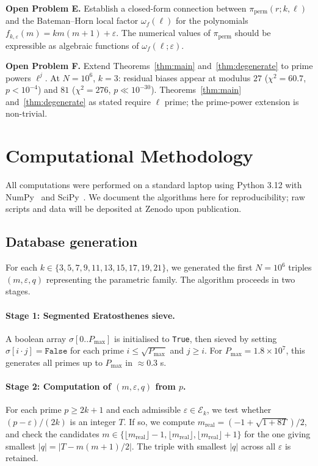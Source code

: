 \documentclass[11pt,a4paper]{article}
\theoremstyle{plain}
\theoremstyle{definition}
\newcommand{\PiP}{\pi_{\mathrm{perm}}}
\newcommand{\eps}{\varepsilon}
\newcommand{\Eclass}{\mathcal{E}}
\begin{document}
\begin{openproblem}
\textbf{Open Problem E.} Establish a closed-form connection between
$\PiP(r; k, \ell)$ and the Bateman--Horn local factor $\omega_f(\ell)$ for the
polynomials $f_{k, \eps}(m) = km(m+1) + \eps$. The numerical values of
$\PiP$ should be expressible as algebraic functions of $\omega_f(\ell; \eps)$.
\end{openproblem}

\begin{openproblem}
\textbf{Open Problem F.} Extend Theorems~\ref{thm:main} and~\ref{thm:degenerate}
to prime powers $\ell^j$. At $N = 10^6$, $k = 3$: residual biases appear at
modulus $27$ ($\chi^2 = 60.7$, $p < 10^{-4}$) and $81$ ($\chi^2 = 276$,
$p \ll 10^{-30}$). Theorems~\ref{thm:main} and~\ref{thm:degenerate} as stated
require $\ell$ prime; the prime-power extension is non-trivial.
\end{openproblem}

\section{Computational Methodology}
\label{sec:methodology}

All computations were performed on a standard laptop using Python 3.12 with
NumPy~\cite{numpy} and SciPy~\cite{scipy}. We document the algorithms here for
reproducibility; raw scripts and data will be deposited at Zenodo upon
publication.

\subsection{Database generation}

For each $k \in \{3, 5, 7, 9, 11, 13, 15, 17, 19, 21\}$, we generated the first
$N = 10^6$ triples $(m, \eps, q)$ representing the parametric family. The
algorithm proceeds in two stages.

\paragraph{Stage 1: Segmented Eratosthenes sieve.}
A boolean array $\sigma[0..P_{\max}]$ is initialised to \texttt{True}, then
sieved by setting $\sigma[i \cdot j] = \texttt{False}$ for each prime
$i \le \sqrt{P_{\max}}$ and $j \ge i$. For $P_{\max} = 1.8 \times 10^7$, this
generates all primes up to $P_{\max}$ in $\approx 0.3$ s.

\paragraph{Stage 2: Computation of $(m, \eps, q)$ from $p$.}
For each prime $p \ge 2k+1$ and each admissible $\eps \in \Eclass_k$, we test
whether $(p - \eps) / (2k)$ is an integer $T$. If so, we compute $m_{\mathrm{real}}
= (-1 + \sqrt{1 + 8T})/2$, and check the candidates $m \in \{\lfloor m_{\mathrm{real}}
\rfloor - 1, \lfloor m_{\mathrm{real}} \rfloor, \lfloor m_{\mathrm{real}} \rfloor + 1\}$
for the one giving smallest $|q| = |T - m(m+1)/2|$. The triple with smallest
$|q|$ across all $\eps$ is retained.
\end{document}
